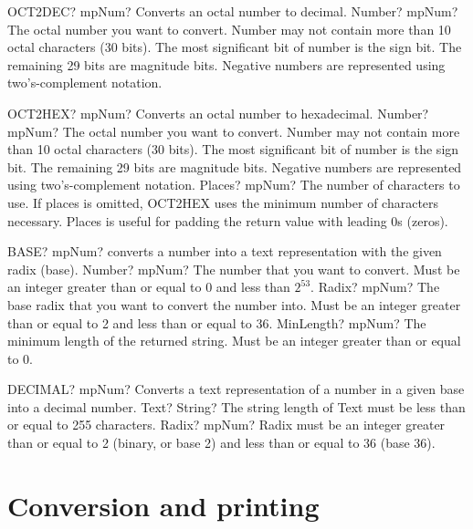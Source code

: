 \documentclass[12pt,a4paper,openany]{book}
\begin{document}
\begin{mpFunctionsExtract}
\mpWorksheetFunctionOneNotImplemented
{OCT2DEC? mpNum? Converts an octal number to decimal.}
{Number? mpNum? The octal number you want to convert. Number may not contain more than 10 octal characters (30 bits). The most significant bit of number is the sign bit. The remaining 29 bits are magnitude bits. Negative numbers are represented using two's-complement notation.}
\end{mpFunctionsExtract}

\begin{mpFunctionsExtract}
\mpWorksheetFunctionTwoNotImplemented
{OCT2HEX? mpNum? Converts an octal number to hexadecimal.}
{Number? mpNum? The octal number you want to convert. Number may not contain more than 10 octal characters (30 bits). The most significant bit of number is the sign bit. The remaining 29 bits are magnitude bits. Negative numbers are represented using two's-complement notation.}
{Places? mpNum? The number of characters to use. If places is omitted, OCT2HEX uses the minimum number of characters necessary. Places is useful for padding the return value with leading 0s (zeros).}
\end{mpFunctionsExtract}

\begin{mpFunctionsExtract}
\mpWorksheetFunctionThree
{BASE? mpNum? converts a number into a text representation with the given radix (base).}
{Number? mpNum? The number that you want to convert. Must be an integer greater than or equal to 0 and less than $2^53$.}
{Radix? mpNum? The base radix that you want to convert the number into. Must be an integer greater than or equal to 2 and less than or equal to 36.}
{MinLength? mpNum? The minimum length of the returned string. Must be an integer greater than or equal to 0.}
\end{mpFunctionsExtract}

\begin{mpFunctionsExtract}
\mpWorksheetFunctionTwoNotImplemented
{DECIMAL? mpNum? Converts a text representation of a number in a given base into a decimal number.}
{Text? String? The string length of Text must be less than or equal to 255 characters.}
{Radix? mpNum? Radix must be an integer greater than or equal to 2 (binary, or base 2) and less than or equal to 36 (base 36).}
\end{mpFunctionsExtract}

\section{Conversion and printing}
\end{document}
